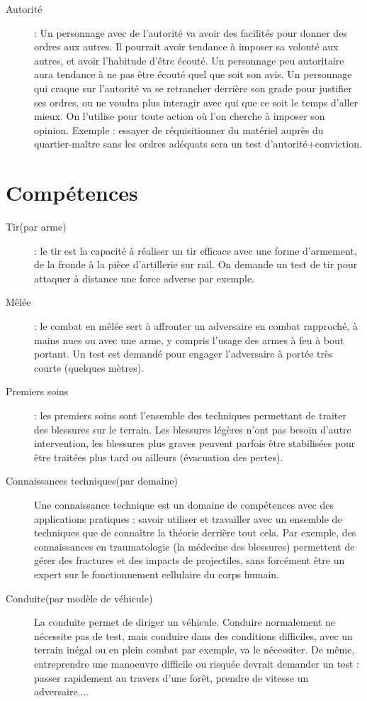 \documentclass{report}
\begin{document}
\begin{multicols}{2}
\begin{description}
    \item[Autorité]: Un personnage avec de l'autorité va avoir des facilités pour donner des ordres aux autres. Il pourrait avoir tendance à imposer sa volonté aux autres, et avoir l'habitude d'être écouté. Un personnage peu autoritaire aura tendance à ne pas être écouté quel que soit son avis. Un personnage qui craque sur l'autorité va se retrancher derrière son grade pour justifier ses ordres, ou ne voudra plus interagir avec qui que ce soit le temps d'aller mieux. On l'utilise pour toute action où l'on cherche à imposer son opinion. Exemple : essayer de réquisitionner du matériel auprès du quartier-maître sans les ordres adéquats sera un test d'autorité+conviction.
\end{description}
\section{Compétences}
\begin{description}
    \item[Tir(par arme)]: le tir est la capacité à réaliser un tir efficace avec une forme d'armement, de la fronde à la pièce d'artillerie sur rail. On demande un test de tir pour attaquer à distance une force adverse par exemple.
    \item[Mêlée]: le combat en mêlée sert à affronter un adversaire en combat rapproché, à mains nues ou avec une arme, y compris l'usage des armes à feu à bout portant. Un test est demandé pour engager l'adversaire à portée très courte (quelques mètres).
    \item[Premiers soins]: les premiers soins sont l'ensemble des techniques permettant de traiter des blessures sur le terrain. Les blessures légères n'ont pas besoin d'autre intervention, les blessures plus graves peuvent parfois être stabilisées pour être traitées plus tard ou ailleurs (évacuation des pertes).
    \item[Connaissances techniques(par domaine)] Une connaissance technique est un domaine de compétences avec des applications pratiques : savoir utiliser et travailler avec un ensemble de techniques que de connaître la théorie derrière tout cela. Par exemple, des connaissances en traumatologie (la médecine des blessures) permettent de gérer des fractures et des impacts de projectiles, sans forcément être un expert sur le fonctionnement cellulaire du corps humain.
    \item[Conduite(par modèle de véhicule)] La conduite permet de diriger un véhicule. Conduire normalement ne nécessite pas de test, mais conduire dans des conditions difficiles, avec un terrain inégal ou en plein combat par exemple, va le nécessiter. De même, entreprendre une manoeuvre difficile ou risquée devrait demander un test : passer rapidement au travers d'une forêt, prendre de vitesse un adversaire....

\end{description}
\end{multicols}
\end{document}
